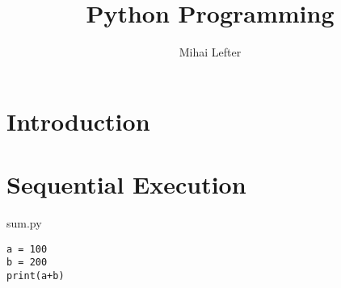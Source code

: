 \documentclass[aspectratio=1610,t]{beamer}
\author{Mihai Lefter}
\title{Python Programming}
\begin{document}

\makeTitleSlide{}

\section{Introduction}
\makeTableOfContents



\section{Sequential Execution}

\begin{pframe}
 \begin{center}
  
 \end{center}
\end{pframe}


\begin{pframe}
 \begin{minipage}{0.37\textwidth}
  \begin{center}
   
  \end{center}
 \end{minipage}%
 \begin{minipage}{0.57\textwidth}
  \begin{pythonfile}{sum.py}
   \begin{verbatim}
a = 100
b = 200
print(a+b)
   \end{verbatim}
  \end{pythonfile}
 \begin{terminal}
  \end{terminal}
 \end{minipage}
\end{pframe}
\end{document}
